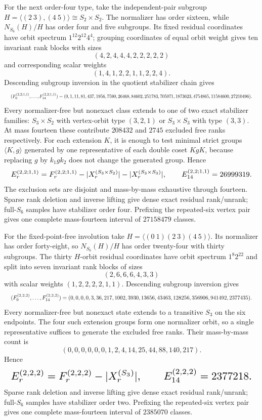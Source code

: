 \documentclass{article}
\newcommand{\fitmath}[1]{\resizebox{0.99\linewidth}{!}{$\displaystyle #1$}}
\begin{document}
For the next order-four type, take the independent-pair subgroup
$H=\langle(2\ 3),(4\ 5)\rangle\cong S_2\times S_2$. The normalizer has
order sixteen, while $N_{S_6}(H)/H$ has order four and five subgroups. Its
fixed residual coordinates have orbit spectrum $1^{12}2^{12}4^4$; grouping
coordinates of equal orbit weight gives ten invariant rank blocks with sizes
\[
  (4,2,4,4,4,2,2,2,2,2)
\]
and corresponding scalar weights
\[
  (1,4,1,2,2,1,1,2,2,4).
\]
Descending subgroup inversion in the quotient stabilizer chain gives
\[
  \fitmath{%
    (F_0^{(2,2;1,1)},\ldots,F_{14}^{(2,2;1,1)})=
    (0,1,11,81,437,1956,7590,26468,84602,251783,705071,1873623,
     4754865,11584600,27210496).
  }
\]
Every normalizer-free but nonexact class extends to one of two exact stabilizer
families: $S_3\times S_2$ with vertex-orbit type $(3,2,1)$ or
$S_3\times S_3$ with type $(3,3)$. At mass fourteen these contribute
$208432$ and $2745$ excluded free ranks respectively. For each extension $K$,
it is enough to test minimal strict groups $\langle K,g\rangle$ generated by one
representative of each double coset $KgK$, because replacing $g$ by
$k_1gk_2$ does not change the generated group. Hence
\begin{equation}
  \fitmath{%
    E_r^{(2,2;1,1)}=F_r^{(2,2;1,1)}
      -|X_r^{(S_3\times S_2)}|-|X_r^{(S_3\times S_3)}|,
    \qquad E_{14}^{(2,2;1,1)}=26999319.
  }
  \label{eq:optimization-crazy-sextuple-s6-full-s2s2-ranking}
\end{equation}
The exclusion sets are disjoint and mass-by-mass exhaustive through fourteen.
Sparse rank deletion and inverse lifting give dense exact residual rank/unrank;
full-$S_6$ samples have stabilizer order four. Prefixing the repeated-six
vertex pair gives one complete mass-fourteen interval of $27158479$ classes.

For the fixed-point-free involution take
$H=\langle(0\ 1)(2\ 3)(4\ 5)\rangle$. Its normalizer has order forty-eight,
so $N_{S_6}(H)/H$ has order twenty-four with thirty subgroups. The thirty
$H$-orbit residual coordinates have orbit spectrum $1^8 2^{22}$ and split into
seven invariant rank blocks of sizes
\[
  (2,6,6,6,4,3,3)
\]
with scalar weights $(1,2,2,2,2,1,1)$. Descending subgroup inversion gives
\[
  \fitmath{%
    (F_0^{(2,2,2)},\ldots,F_{14}^{(2,2,2)})=
    (0,0,0,0,3,36,217,1002,3930,13656,43463,128256,356906,
     941492,2377435).
  }
\]
Every normalizer-free but nonexact state extends to a transitive $S_3$ on the
six endpoints. The four such extension groups form one normalizer orbit, so a
single representative suffices to generate the excluded free ranks. Their
mass-by-mass count is
\[
  (0,0,0,0,0,0,1,2,4,14,25,44,88,140,217).
\]
Hence
\begin{equation}
  \fitmath{%
    E_r^{(2,2,2)}=F_r^{(2,2,2)}-|X_r^{(S_3)}|,
    \qquad E_{14}^{(2,2,2)}=2377218.
  }
  \label{eq:optimization-crazy-sextuple-s6-full-triple-transposition-ranking}
\end{equation}
Sparse rank deletion and inverse lifting give dense exact residual rank/unrank;
full-$S_6$ samples have stabilizer order two. Prefixing the repeated-six vertex
pair gives one complete mass-fourteen interval of $2385070$ classes.
\end{document}
